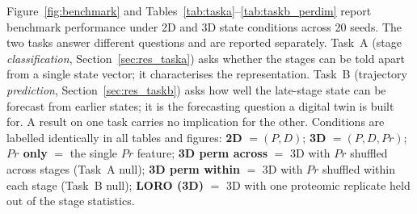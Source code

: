 \documentclass[5p,times,twocolumn]{elsarticle}
\newcommand{\rtag}[1]{}
\newcommand{\rev}[2]{\rtag{#1}#2}
\newcommand{\lang}[1]{#1}
\begin{document}
Figure~\ref{fig:benchmark} and
Tables~\ref{tab:taska}--\ref{tab:taskb_perdim} report benchmark
performance under 2D and 3D state conditions across 20 seeds.
\rev{R2.23}{The two tasks answer different questions and are
  reported separately. Task~A (stage \textit{classification},
  Section~\ref{sec:res_taska}) asks whether the stages can be told
  apart from a single state vector; it characterises the
  representation. Task~B (trajectory \textit{prediction},
  Section~\ref{sec:res_taskb}) asks how well the late-stage state
  can be forecast from earlier states; it is the forecasting
  question a digital twin is built for. A result on one task
  carries no implication for the other.}
\rev{R1.7}{Conditions are labelled identically in all tables and
  figures: \textbf{2D} $=(P,D)$; \textbf{3D} $=(P,D,Pr)$;
  \textbf{$Pr$ only} $=$ the single $Pr$ feature;
  \textbf{3D perm across} $=$ 3D with $Pr$ shuffled across stages
  (Task~A null); \textbf{3D perm within} $=$ 3D with $Pr$ shuffled
  within each stage (Task~B null); \textbf{LORO (3D)} $=$ 3D with
  one proteomic replicate held out of the stage statistics.}

\begin{table}[!htbp]
  \caption{%
    Task A --- stage separability (3-class macro F1,
    $n = 30$ held-out trajectories).
    Mean $\pm$ std across 20 seeds.
    The \texttt{perm\_across} null collapses 3D performance back
    to $\sim$2D, confirming \lang{that} the lift \lang{reflects} real proteomic-stage
    signal rather than added model capacity.
    The $Pr$-only column locates the signal on the single
    monotonic $Pr$ axis; the LORO column (each \lang{canonical} CTRL
    replicate held out from the stage mean) tests generalisation
    beyond replicates that contributed to the stage definition.
    \rev{R1.7,R1.8}{Because $Pr$ only equals 3D, the 3D score is
      evidence of stage separability on the $Pr$ axis, not of model
      superiority. LORO is mean $\pm$ s.d.\ over the 7 held-out
      replicates, not over seeds.}}
  \label{tab:taska}
  \centering
\end{table}
\end{document}
